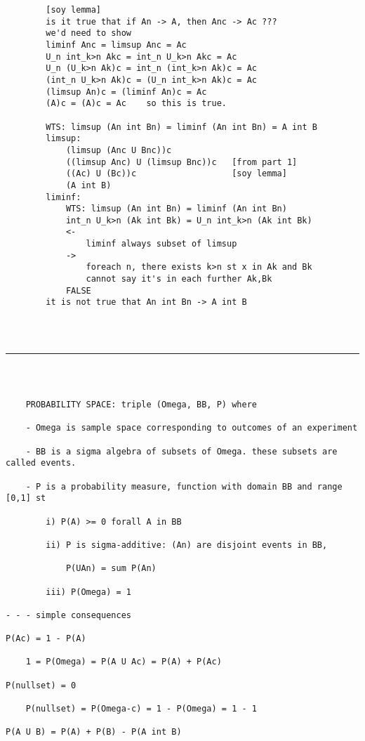 \documentclass{article}
\begin{document}
\begin{flushleft}
\begin{verbatim}
        [soy lemma]
        is it true that if An -> A, then Anc -> Ac ???
        we'd need to show 
        liminf Anc = limsup Anc = Ac 
        U_n int_k>n Akc = int_n U_k>n Akc = Ac 
        U_n (U_k>n Ak)c = int_n (int_k>n Ak)c = Ac 
        (int_n U_k>n Ak)c = (U_n int_k>n Ak)c = Ac
        (limsup An)c = (liminf An)c = Ac 
        (A)c = (A)c = Ac    so this is true.

        WTS: limsup (An int Bn) = liminf (An int Bn) = A int B
        limsup: 
            (limsup (Anc U Bnc))c 
            ((limsup Anc) U (limsup Bnc))c   [from part 1]
            ((Ac) U (Bc))c                   [soy lemma]
            (A int B)
        liminf:
            WTS: limsup (An int Bn) = liminf (An int Bn)
            int_n U_k>n (Ak int Bk) = U_n int_k>n (Ak int Bk)
            <- 
                liminf always subset of limsup 
            -> 
                foreach n, there exists k>n st x in Ak and Bk
                cannot say it's in each further Ak,Bk
            FALSE
        it is not true that An int Bn -> A int B




\end{verbatim}

\bigbreak
\hrule
\bigbreak
\textbf{}

\begin{verbatim}



    PROBABILITY SPACE: triple (Omega, BB, P) where

	- Omega is sample space corresponding to outcomes of an experiment
	
	- BB is a sigma algebra of subsets of Omega. these subsets are called events. 
	
	- P is a probability measure, function with domain BB and range [0,1] st
	
		i) P(A) >= 0 forall A in BB
		
		ii) P is sigma-additive: (An) are disjoint events in BB,
		
			P(UAn) = sum P(An) 
			
		iii) P(Omega) = 1
		
- - - simple consequences

P(Ac) = 1 - P(A)

	1 = P(Omega) = P(A U Ac) = P(A) + P(Ac)

P(nullset) = 0

	P(nullset) = P(Omega-c) = 1 - P(Omega) = 1 - 1
	
P(A U B) = P(A) + P(B) - P(A int B)


\end{verbatim}
\end{flushleft}
\end{document}
